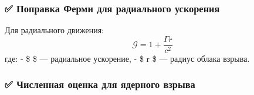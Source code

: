 \documentclass[11pt]{article}
\begin{document}
\subsubsection{✅ Поправка Ферми для радиального
ускорения}\label{ux43fux43eux43fux440ux430ux432ux43aux430-ux444ux435ux440ux43cux438-ux434ux43bux44f-ux440ux430ux434ux438ux430ux43bux44cux43dux43eux433ux43e-ux443ux441ux43aux43eux440ux435ux43dux438ux44f}

Для радиального движения: \[
\boxed{
\mathcal{G} = 1 + \frac{\Gamma r}{c^2}
}
\] где: - \$ \Gamma \$ --- радиальное ускорение, - \$ r \$ --- радиус
облака взрыва.

\subsubsection{✅ Численная оценка для ядерного
взрыва}\label{ux447ux438ux441ux43bux435ux43dux43dux430ux44f-ux43eux446ux435ux43dux43aux430-ux434ux43bux44f-ux44fux434ux435ux440ux43dux43eux433ux43e-ux432ux437ux440ux44bux432ux430}
\end{document}
